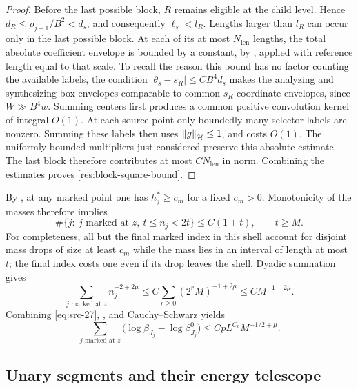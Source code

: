 \begin{proof}
Before the last possible block, $R$ remains eligible at the child
level.  Hence $d_R\le\rho_{j+1}/B^2<d_s$, and consequently
$\ell_s<l_R$.  Lengths larger than $l_R$ can occur only in the last
possible block.  At each of its at most $N_{\mathrm{len}}$ lengths, the total
absolute coefficient envelope is bounded by a constant, by
, applied with reference length equal to
that scale.  To recall the reason this bound has no
factor counting the available labels, the condition
$|\theta_s-s_R|\le CB^4d_s$ makes the analyzing and synthesizing
box envelopes comparable to common $s_R$-coordinate envelopes, since
$W\gg B^4w$.  Summing centers first produces a common positive
convolution kernel of integral $O(1)$.  At each source point only
boundedly many selector labels are nonzero.  Summing these labels
then uses $\left\|g\right\|_{\mathcal H}\le1$, and costs $O(1)$.
The uniformly bounded multipliers just considered preserve this
absolute estimate.  The last block therefore contributes at most
$C N_{\mathrm{len}}$ in norm.  Combining the estimates proves
\eqref{res:block-square-bound}.
\end{proof}

By , at any marked point one has $h_j^*\ge c_m$
for a fixed $c_m>0$.  Monotonicity of the masses therefore implies
\begin{equation}
  \#\{j:\ j\text{ marked at }z,\ t\le n_j<2t\}
         \le C(1+t),\qquad t\ge M.
  \label{res:marked-shell-count}
\end{equation}
For completeness, all but the final marked index in this shell
account for disjoint mass drops of size at least $c_m$ while the mass
lies in an interval of length at most $t$; the final index costs one
even if its drop leaves the shell.  Dyadic summation gives
\begin{equation}
 \sum_{j\text{ marked at }z}n_j^{-2+2\mu}
       \le C\sum_{r\ge0}(2^rM)^{-1+2\mu}
       \le C M^{-1+2\mu}.
 \label{res:marked-weight-sum}
\end{equation}
Combining \eqref{eq:src-27}, , and
Cauchy--Schwarz yields
\begin{equation}
 \sum_{j\text{ marked at }z}
       \bigl(\log\beta_{J_j}-\log\beta_{J_j}^0\bigr)
       \le CpL^{C_b}M^{-1/2+\mu}.
 \label{res:marked-cost}
\end{equation}

\subsection{Unary segments and their energy telescope}

